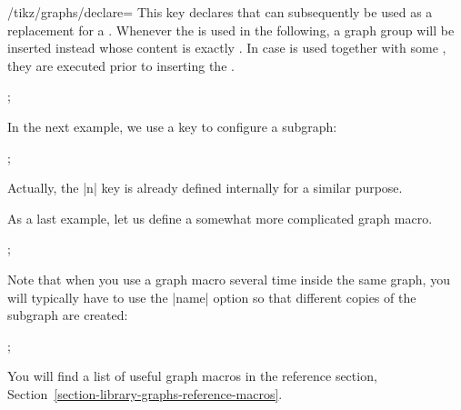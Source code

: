 \begin{key}{/tikz/graphs/declare=}
  This key declares that  can subsequently be used as
  a replacement for a . Whenever the 
  is used in the following, a graph group will be inserted instead
  whose content is exactly . In case  is used together with some , they are executed
  prior to inserting the .
\begin{codeexample}[]
\tikz {};
\end{codeexample}
  In the next example, we use a key to configure a subgraph:
\begin{codeexample}[]
\tikz {};
\end{codeexample}
  Actually, the |n| key is already defined internally for a similar
  purpose.

  As a last example, let us define a somewhat more complicated graph
  macro. 
\begin{codeexample}[]
\newcount\mycount  
{}
\tikz {};
\end{codeexample}
\end{key}

Note that when you use a graph macro several time inside the same
graph, you will typically have to use the |name| option so that
different copies of the subgraph are created:
\begin{codeexample}[]
\tikz {};
\end{codeexample}

You will find a list of useful graph macros in the reference section,
Section~\ref{section-library-graphs-reference-macros}. 


